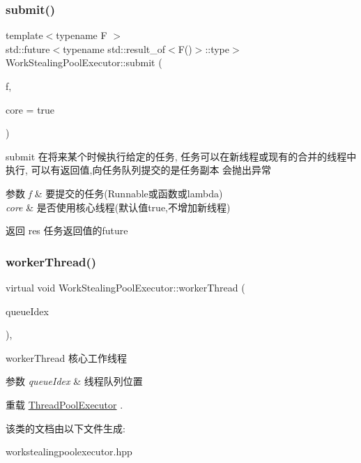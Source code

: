 \subsubsection{\texorpdfstring{submit()}{submit()}}
{\footnotesize\ttfamily template$<$typename F $>$ \\
std\+::future$<$typename std\+::result\+\_\+of$<$F()$>$\+::type$>$ Work\+Stealing\+Pool\+Executor\+::submit (\begin{DoxyParamCaption}\item[{F}]{f,  }\item[{bool}]{core = {\ttfamily true} }\end{DoxyParamCaption})\hspace{0.3cm}{\ttfamily [inline]}}



submit 在将来某个时候执行给定的任务, 任务可以在新线程或现有的合并的线程中执行, 可以有返回值,向任务队列提交的是任务副本 会抛出异常 


\begin{DoxyParams}{参数}
{\em f} & 要提交的任务(Runnable或函数或lambda) \\
\hline
{\em core} & 是否使用核心线程(默认值true,不增加新线程)\\
\hline
\end{DoxyParams}
\begin{DoxyReturn}{返回}
res 任务返回值的future 
\end{DoxyReturn}
\mbox{\label{classWorkStealingPoolExecutor_ad00399d153ba5d77704dae2c1816b566}} 
\subsubsection{\texorpdfstring{worker\+Thread()}{workerThread()}}
{\footnotesize\ttfamily virtual void Work\+Stealing\+Pool\+Executor\+::worker\+Thread (\begin{DoxyParamCaption}\item[{size\+\_\+t}]{queue\+Idex }\end{DoxyParamCaption})\hspace{0.3cm}{\ttfamily [override]}, {\ttfamily [virtual]}}



worker\+Thread 核心工作线程 


\begin{DoxyParams}{参数}
{\em queue\+Idex} & 线程队列位置 \\
\hline
\end{DoxyParams}


重载 \hyperlink{classThreadPoolExecutor_a844902ce61fb16b11a569b8ee56e80e9}{Thread\+Pool\+Executor} .



该类的文档由以下文件生成\+:\begin{DoxyCompactItemize}
\item 
workstealingpoolexecutor.\+hpp\end{DoxyCompactItemize}
